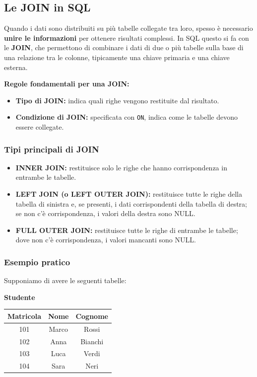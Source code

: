 \documentclass[a4paper,12pt]{article}
\newcommand{\code}[1]{\texttt{#1}}
\begin{document}
\subsection{Le JOIN in SQL}

Quando i dati sono distribuiti su più tabelle collegate tra loro, spesso è necessario \textbf{unire le informazioni} per ottenere risultati complessi.  
In SQL questo si fa con le \textbf{JOIN}, che permettono di combinare i dati di due o più tabelle sulla base di una relazione tra le colonne, tipicamente una chiave primaria e una chiave esterna.

\bigskip
\textbf{Regole fondamentali per una JOIN:}
\begin{itemize}
    \item \textbf{Tipo di JOIN:} indica quali righe vengono restituite dal risultato.
    \item \textbf{Condizione di JOIN:} specificata con \code{ON}, indica come le tabelle devono essere collegate.
\end{itemize}

\subsubsection{Tipi principali di JOIN}

\begin{itemize}
    \item \textbf{INNER JOIN:} restituisce solo le righe che hanno corrispondenza in entrambe le tabelle.
    \item \textbf{LEFT JOIN (o LEFT OUTER JOIN):} restituisce tutte le righe della tabella di sinistra e, se presenti, i dati corrispondenti della tabella di destra; se non c'è corrispondenza, i valori della destra sono NULL.
    \item \textbf{FULL OUTER JOIN:} restituisce tutte le righe di entrambe le tabelle; dove non c'è corrispondenza, i valori mancanti sono NULL.
\end{itemize}

\subsubsection*{Esempio pratico}

Supponiamo di avere le seguenti tabelle:

\textbf{Studente}
\begin{center}
\begin{tabular}{|c|c|c|}
\hline
\textbf{Matricola} & \textbf{Nome} & \textbf{Cognome} \\
\hline
101 & Marco & Rossi \\
102 & Anna & Bianchi \\
103 & Luca & Verdi \\
104 & Sara & Neri \\
\hline
\end{tabular}
\end{center}
\end{document}
